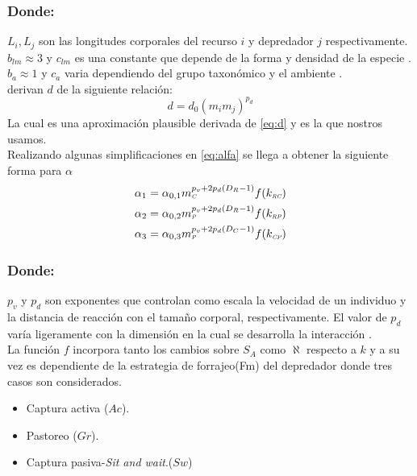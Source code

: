 \subsubsection*{Donde:}
$L_i , L_j$ son las longitudes corporales del recurso $i$ y depredador $j$ respectivamente. \\
$b_{lm} \approx 3 $ y $c_{lm}$ es una constante que depende de la forma y densidad de la especie \citep{peters1986ecological,mcgill2006allometric}. \\
$b_a \approx 1 $ y $c_a$ varia dependiendo del grupo taxon\'omico y el ambiente \citep{kiltie2000scaling} .\\
\cite{pawar2012dimensionality} derivan $d$ de la siguiente relaci\'on:
\[ d = d_0(m_im_j)^{p_d} \]
La cual es una aproximaci\'on plausible derivada de \eqref{eq:d} y es la que nostros usamos.\\
Realizando algunas simplificaciones en \eqref{eq:alfa} se llega a obtener la siguiente forma para $\alpha$ 
\begin{equation}\label{eq:p4}
\begin{aligned}
&\alpha_1= \alpha_{0,1}m_{\textit{\tiny C}}^{p_v+2p_d(D_R-1)}f(k_{\textit{\tiny RC}})\\
&\alpha_2= \alpha_{0,2}m_{\textit{\tiny P}}^{p_v+2p_d(D_R-1)}f(k_{\textit{\tiny RP}})\\
&\alpha_3= \alpha_{0,3} m_{\textit{\tiny P}}^{p_v+2p_d(D_C-1)}f(k_{\textit{\tiny CP}})\\
\end{aligned}
\end{equation}
\subsubsection*{Donde:}
$p_v$ y $p_d$ son exponentes que controlan como escala la velocidad de un individuo  y la distancia de reacci\'on con el tama\~no corporal, respectivamente. El valor de $p_d$ var\'ia ligeramente con la dimensi\'on en la cual se desarrolla la interacci\'on \citep{pawar2012dimensionality}.\\
La funci\'on $f$ incorpora tanto los cambios sobre $S_A$ como $\aleph$ respecto a $k$ y a su vez es dependiente de la estrategia de forrajeo(Fm) del depredador donde tres casos son considerados\citep{pawar2012dimensionality}.
\begin{itemize}
\item Captura activa ($Ac$).
\item Pastoreo ($Gr$).
\item Captura pasiva-\textit{Sit and wait}.($Sw$) 
\end{itemize}

